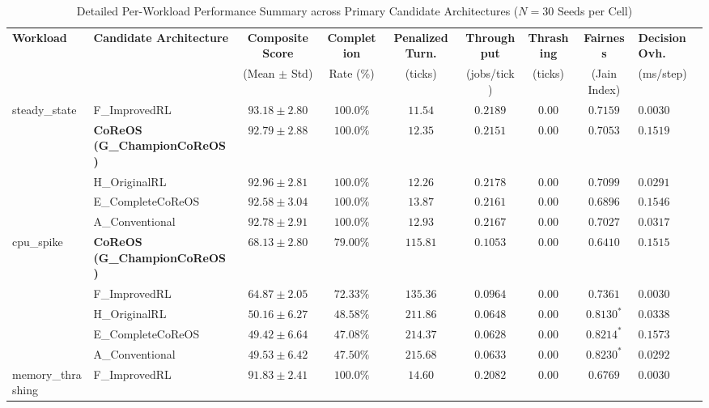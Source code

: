\documentclass[conference]{IEEEtran}
\begin{document}
\begin{table}[!t]
\caption{Detailed Per-Workload Performance Summary across Primary Candidate Architectures ($N=30$ Seeds per Cell)}
\label{tab:per_workload}
\centering
\footnotesize
\begin{tabularx}{\textwidth}{llccccccX}
\toprule
\textbf{Workload} & \textbf{Candidate Architecture} & \textbf{Composite Score} & \textbf{Completion} & \textbf{Penalized Turn.} & \textbf{Throughput} & \textbf{Thrashing} & \textbf{Fairness} & \textbf{Decision Ovh.} \\
& & (Mean $\pm$ Std) & Rate (\%) & (ticks) & (jobs/tick) & (ticks) & (Jain Index) & (ms/step) \\
\midrule
\multirow{5}{*}{steady\_state} & F\_ImprovedRL & $\mathbf{93.18 \pm 2.80}$ & $100.0\%$ & $\mathbf{11.54}$ & $\mathbf{0.2189}$ & $\mathbf{0.00}$ & $\mathbf{0.7159}$ & $0.0030$ \\
& \textbf{CoReOS (G\_ChampionCoReOS)} & $92.79 \pm 2.88$ & $100.0\%$ & $12.35$ & $0.2151$ & $\mathbf{0.00}$ & $0.7053$ & $0.1519$ \\
& H\_OriginalRL & $92.96 \pm 2.81$ & $100.0\%$ & $12.26$ & $0.2178$ & $\mathbf{0.00}$ & $0.7099$ & $0.0291$ \\
& E\_CompleteCoReOS & $92.58 \pm 3.04$ & $100.0\%$ & $13.87$ & $0.2161$ & $\mathbf{0.00}$ & $0.6896$ & $0.1546$ \\
& A\_Conventional & $92.78 \pm 2.91$ & $100.0\%$ & $12.93$ & $0.2167$ & $\mathbf{0.00}$ & $0.7027$ & $0.0317$ \\
\midrule
\multirow{5}{*}{cpu\_spike} & \textbf{CoReOS (G\_ChampionCoReOS)} & $\mathbf{68.13 \pm 2.80}$ & $\mathbf{79.00\%}$ & $\mathbf{115.81}$ & $\mathbf{0.1053}$ & $\mathbf{0.00}$ & $0.6410$ & $0.1515$ \\
& F\_ImprovedRL & $64.87 \pm 2.05$ & $72.33\%$ & $135.36$ & $0.0964$ & $\mathbf{0.00}$ & $0.7361$ & $0.0030$ \\
& H\_OriginalRL & $50.16 \pm 6.27$ & $48.58\%$ & $211.86$ & $0.0648$ & $\mathbf{0.00}$ & $0.8130^*$ & $0.0338$ \\
& E\_CompleteCoReOS & $49.42 \pm 6.64$ & $47.08\%$ & $214.37$ & $0.0628$ & $\mathbf{0.00}$ & $0.8214^*$ & $0.1573$ \\
& A\_Conventional & $49.53 \pm 6.42$ & $47.50\%$ & $215.68$ & $0.0633$ & $\mathbf{0.00}$ & $0.8230^*$ & $0.0292$ \\
\midrule
\multirow{5}{*}{memory\_thrashing} & F\_ImprovedRL & $\mathbf{91.83 \pm 2.41}$ & $100.0\%$ & $\mathbf{14.60}$ & $\mathbf{0.2082}$ & $\mathbf{0.00}$ & $\mathbf{0.6769}$ & $0.0030$ \\

\end{tabularx}
\end{table}
\end{document}
